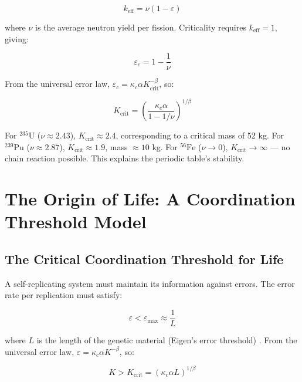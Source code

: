 \documentclass[12pt,a4paper]{article}
\theoremstyle{remark}
\newcommand{\kappac}{\kappa_c}
\newcommand{\eps}{\varepsilon}
\begin{document}
	\begin{equation}
		k_{\text{eff}} = \nu (1 - \eps)
		\label{eq:keff-nuclear}
	\end{equation}
	
	where $\nu$ is the average neutron yield per fission. Criticality requires $k_{\text{eff}} = 1$, giving:
	
	\begin{equation}
		\eps_c = 1 - \frac{1}{\nu}
		\label{eq:eps-c-nuclear}
	\end{equation}
	
	From the universal error law, $\eps_c = \kappac \alpha K_{\text{crit}}^{-\beta}$, so:
	
	\begin{equation}
		K_{\text{crit}} = \left( \frac{\kappac \alpha}{1 - 1/\nu} \right)^{1/\beta}
		\label{eq:Kcrit-nuclear}
	\end{equation}
	
	For $^{235}\text{U}$ ($\nu \approx 2.43$), $K_{\text{crit}} \approx 2.4$, corresponding to a critical mass of 52 kg. For $^{239}\text{Pu}$ ($\nu \approx 2.87$), $K_{\text{crit}} \approx 1.9$, mass $\approx 10$ kg. For $^{56}\text{Fe}$ ($\nu \to 0$), $K_{\text{crit}} \to \infty$ — no chain reaction possible. This explains the periodic table's stability.
	
	\section{The Origin of Life: A Coordination Threshold Model}
	\label{sec:origin-life}
	
	\subsection{The Critical Coordination Threshold for Life}
	
	A self-replicating system must maintain its information against errors. The error rate per replication must satisfy:
	
	\begin{equation}
		\eps < \eps_{\text{max}} \approx \frac{1}{L}
		\label{eq:error-threshold}
	\end{equation}
	
	where $L$ is the length of the genetic material (Eigen's error threshold) \cite{Eigen1971}. From the universal error law, $\eps = \kappac \alpha K^{-\beta}$, so:
	
	\begin{equation}
		K > K_{\text{crit}} = \left( \kappac \alpha L \right)^{1/\beta}
		\label{eq:Kcrit-life}
	\end{equation}
	
\end{document}
